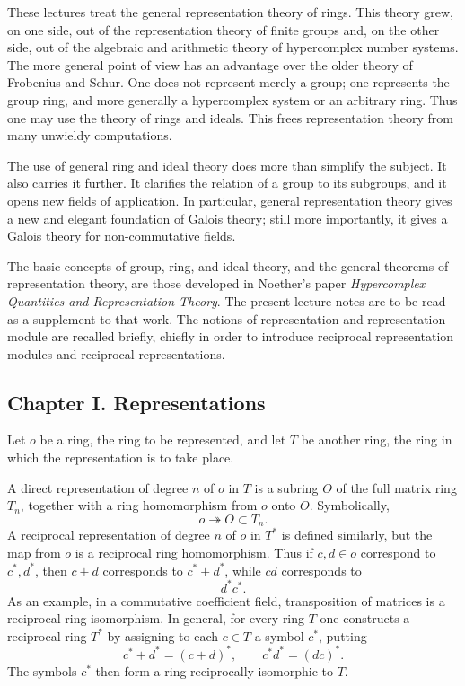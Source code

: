 \documentclass[11pt]{article}
\begin{document}
These lectures treat the general representation theory of rings. This theory grew, on one side, out of the representation theory of finite groups and, on the other side, out of the algebraic and arithmetic theory of hypercomplex number systems. The more general point of view has an advantage over the older theory of Frobenius and Schur. One does not represent merely a group; one represents the group ring, and more generally a hypercomplex system or an arbitrary ring. Thus one may use the theory of rings and ideals. This frees representation theory from many unwieldy computations.

The use of general ring and ideal theory does more than simplify the subject. It also carries it further. It clarifies the relation of a group to its subgroups, and it opens new fields of application. In particular, general representation theory gives a new and elegant foundation of Galois theory; still more importantly, it gives a Galois theory for non-commutative fields.

The basic concepts of group, ring, and ideal theory, and the general theorems of representation theory, are those developed in Noether's paper \textit{Hypercomplex Quantities and Representation Theory}. The present lecture notes are to be read as a supplement to that work. The notions of representation and representation module are recalled briefly, chiefly in order to introduce reciprocal representation modules and reciprocal representations.

\subsection{Chapter I. Representations}

Let \(o\) be a ring, the ring to be represented, and let \(T\) be another ring, the ring in which the representation is to take place.

A direct representation of degree \(n\) of \(o\) in \(T\) is a subring \(O\) of the full matrix ring \(T_n\), together with a ring homomorphism from \(o\) onto \(O\). Symbolically,
\[
  o\twoheadrightarrow O\subset T_n.
\]
A reciprocal representation of degree \(n\) of \(o\) in \(T^*\) is defined similarly, but the map from \(o\) is a reciprocal ring homomorphism. Thus if \(c,d\in o\) correspond to \(c^*,d^*\), then \(c+d\) corresponds to \(c^*+d^*\), while \(cd\) corresponds to
\[
  d^*c^*.
\]
As an example, in a commutative coefficient field, transposition of matrices is a reciprocal ring isomorphism. In general, for every ring \(T\) one constructs a reciprocal ring \(T^*\) by assigning to each \(c\in T\) a symbol \(c^*\), putting
\[
  c^*+d^*=(c+d)^*,\qquad c^*d^*=(dc)^*.
\]
The symbols \(c^*\) then form a ring reciprocally isomorphic to \(T\).
\end{document}
